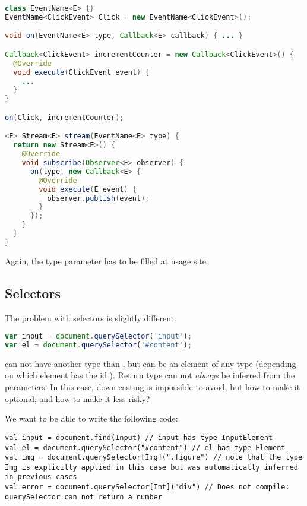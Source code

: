 \documentclass[runningheads,a4paper]{llncs}
\begin{document}
\begin{lstlisting}[language=Java]
class EventName<E> {}
EventName<ClickEvent> Click = new EventName<ClickEvent>();

void on(EventName<E> type, Callback<E> callback) { ... }

Callback<ClickEvent> incrementCounter = new Callback<ClickEvent>() {
  @Override
  void execute(ClickEvent event) {
    ...
  }
}

on(Click, incrementCounter);

<E> Stream<E> stream(EventName<E> type) {
  return new Stream<E>() {
    @Override
    void subscribe(Observer<E> observer) {
      on(type, new Callback<E> {
        @Override
        void execute(E event) {
          observer.publish(event);
        }
      });
    }
  }
}

\end{lstlisting}

Again, the type parameter  has to be filled at usage site.

\subsection{Selectors}

The problem with selectors is slightly different.

\begin{lstlisting}[language=JavaScript]
var input = document.querySelector('input');
var el = document.querySelector('#content');
\end{lstlisting}

 can not have another type than , but  can be an element of any type (depending
on which element has the id ). Return type can not \emph{always} be inferred from the parameters.
In this case, down-casting is impossible to avoid, but how to make it optional, and how to make it less risky?

We want to be able to write the following code:

\begin{lstlisting}
val input = document.find(Input) // input has type InputElement
val el = document.querySelector("#content") // el has type Element
val img = document.querySelector[Img](".figure") // note that the type Img is explicitly applied in this case but was automatically inferred in previous cases
val error = document.querySelector[Int]("div") // Does not compile: querySelector can not return a number
\end{lstlisting}
\end{document}
